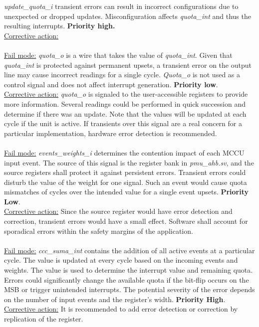 \textit{update\_quota\_i} transient errors can result in incorrect configurations due to unexpected or dropped updates. Misconfiguration affects \textit{quota\_int} and thus the resulting interrupts.\textbf{ Priority high.}\\
\underline{Corrective action:}\\
\\
\underline{Fail mode:} \textit{quota\_o} is a wire that takes the value of \textit{quota\_int}. Given that \textit{quota\_int} is protected against permanent upsets, a transient error on the output line may cause incorrect readings for a single cycle.\textit{ Quota\_o} is not used as a control signal and does not affect interrupt generation. \textbf{Priority low}.\\
\underline{Corrective action:} \textit{quota\_o} is signaled to the user-accessible registers to provide more information. Several readings could be performed in quick succession and determine if there was an update. Note that the values will be updated at each cycle if the unit is active. If transients over this signal are a real concern for a particular implementation, hardware error detection is recommended. \\
\\
\underline{Fail mode:} \textit{events\_weights\_i} determines the contention impact of each MCCU input event. The source of this signal is the register bank in \textit{pmu\_ahb.sv}, and the source registers shall protect it against persistent errors. Transient errors could disturb the value of the weight for one signal. Such an event would cause quota mismatches of  cycles over the intended value for a single event upsets.  \textbf{Priority Low}.\\
\underline{Corrective action:} Since the source register would have error detection and correction, transient errors would have a small effect. Software shall account for sporadical errors within the safety margins of the application. \\
\\
\underline{Fail mode:} \textit{ccc\_suma\_int} contains the addition of all active events at a particular cycle. The value is updated at every cycle based on the incoming events and weights. The value is used to determine the interrupt value and remaining quota. Errors could significantly change the available quota if the bit-flip occurs on the MSB or trigger unintended interrupts. The potential severity of the error depends on the number of input events and the register's width. \textbf{Priority High}.\\
\underline{Corrective action:} It is recommended to add error detection or correction by replication of the register.\\
\\
